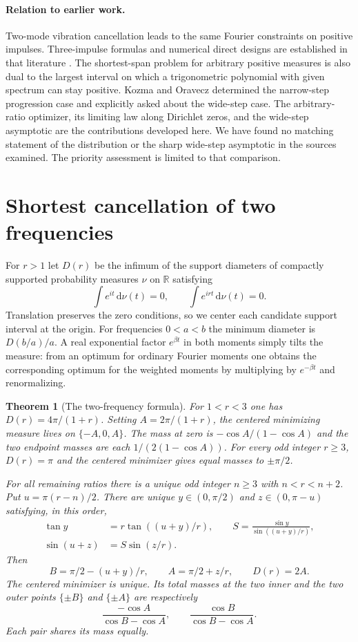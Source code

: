 \documentclass[11pt,letterpaper]{article}
\newtheorem{theorem}{Theorem}[section]
\theoremstyle{remark}\newtheorem{remark}[theorem]{Remark}
\newcommand{\rd}{\,\mathrm{d}}
\begin{document}
\paragraph{Relation to earlier work.}
Two-mode vibration cancellation leads to the same Fourier constraints on
positive impulses. Three-impulse formulas and numerical direct designs
are established in that literature \cite{Crain,Rappole}. The
shortest-span problem for arbitrary positive measures is also dual to the
largest interval on which a trigonometric polynomial with given spectrum
can stay positive. Kozma and Oravecz \cite{KO} determined the narrow-step
progression case and explicitly asked about the wide-step case. The
arbitrary-ratio optimizer, its limiting law along Dirichlet zeros, and the
wide-step asymptotic are the contributions developed here. We have found
no matching statement of the distribution or the sharp wide-step asymptotic
in the sources examined. The priority assessment is limited to that comparison.


\section{Shortest cancellation of two frequencies}\label{pair:sec}
For $r>1$ let $D(r)$ be the infimum of the support diameters of compactly
supported probability measures $\nu$ on $\mathbb R$ satisfying
\[
   \int e^{it}\rd\nu(t)=0,\qquad \int e^{irt}\rd\nu(t)=0.
\]
Translation preserves the zero conditions, so we center each candidate
support interval at the origin. For frequencies $0<a<b$ the minimum
diameter is $D(b/a)/a$. A real exponential factor $e^{\beta t}$
in both moments simply tilts the measure: from an optimum for ordinary
Fourier moments one obtains the corresponding optimum for the weighted
moments by multiplying by $e^{-\beta t}$ and renormalizing.

\begin{theorem}[The two-frequency formula]\label{pair:exact}
For $1<r<3$ one has $D(r)=4\pi/(1+r)$. Setting
$A=2\pi/(1+r)$, the centered minimizing measure lives on
$\{-A,0,A\}$. The mass at zero is $-\cos A/(1-\cos A)$ and the
two endpoint masses are each $1/(2(1-\cos A))$.
For every odd integer $r\ge3$, $D(r)=\pi$ and the centered minimizer
gives equal masses to $\pm\pi/2$.

For all remaining ratios there is a unique odd integer $n\ge3$ with
$n<r<n+2$. Put $u=\pi(r-n)/2$.
There are unique $y\in(0,\pi/2)$ and $z\in(0,\pi-u)$ satisfying, in this order,
\begin{align}
 \tan y &=r\tan((u+y)/r),\qquad
 S=\frac{\sin y}{\sin((u+y)/r)},\label{pair:y}\\
 \sin(u+z)&=S\sin(z/r).\label{pair:z}
\end{align}
Then
\[
 B=\pi/2-(u+y)/r,\qquad A=\pi/2+z/r,\qquad D(r)=2A.
\]
The centered minimizer is unique. Its total masses at the two inner and
the two outer points $\{\pm B\}$ and $\{\pm A\}$ are respectively
\[
 \frac{-\cos A}{\cos B-\cos A},\qquad
 \frac{\cos B}{\cos B-\cos A}.
\]
Each pair shares its mass equally.
\end{theorem}
\end{document}
